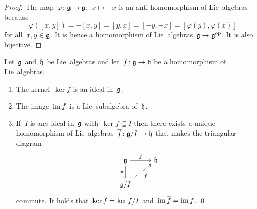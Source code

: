 \begin{proof}
  The map~$\varphi \colon \mathfrak{g} \to \mathfrak{g}$,~$x \mapsto -x$ is an anti-homomorphism of Lie~algebras because
  \[
    \varphi([x,y])
    =
    -[x,y]
    =
    [y,x]
    =
    [-y,-x]
    =
    [\varphi(y), \varphi(x)]
  \]
  for all~$x, y \in \mathfrak{g}$.
  It is hence a homomorphism of Lie~algebras~$\mathfrak{g} \to \mathfrak{g}^{\mathrm{op}}$.
  It is also bijective.
\end{proof}


\begin{proposition}
  Let~$\mathfrak{g}$ and~$\mathfrak{h}$ be Lie~algebras and let~$f \colon \mathfrak{g} \to \mathfrak{h}$ be a homomorphism of Lie~algebras.
  \begin{enumerate}
    \item
      The kernel~$\ker f$ is an ideal in~$\mathfrak{g}$.
    \item
      The image~$\operatorname{im} f$ is a Lie~subalgebra of~$\mathfrak{h}$.
    \item
      If~$I$ is any ideal in~$\mathfrak{g}$ with~$\ker f \subseteq I$ then there exists a unique homomorphism of Lie~algebras~$\overline{f} \colon \mathfrak{g}/I \to \mathfrak{h}$ that makes the triangular diagram
      \[
        \begin{tikzcd}
          \glie
          \arrow{r}[above]{f}
          \arrow{d}[left]{\pi}
          &
          \hlie
          \\
          \glie/I
          \arrow[dashed]{ur}[below right]{\tilde{f}}
          &
          {}
        \end{tikzcd}
      \]
      commute.
      It holds that~$\ker \overline{f} = {\ker f}/I$ and~$\operatorname{im} \overline{f} = \operatorname{im} f$.
      \qed
  \end{enumerate}
\end{proposition}


